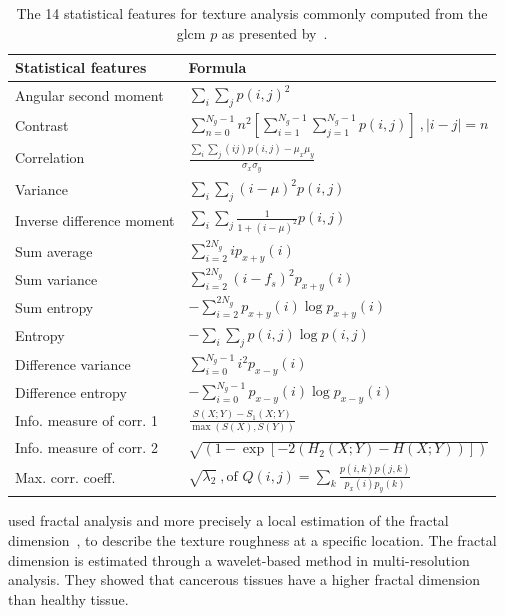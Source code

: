 \begin{enumerate}[leftmargin=*]
\begin{table}
  \caption[The 14 statistical features used in conjunction with \acs*{glcm}
  analysis.]{The 14 statistical features for texture analysis commonly computed
    from the \acs*{glcm} $p$ as presented by~\cite{Haralick1973}.}
  \renewcommand{\arraystretch}{1.5}
  \centering
  \begin{tabular}{ll}
    \toprule
    \textbf{Statistical features} & \textbf{Formula} \\
    \midrule
    Angular second moment & $\sum_i \sum_j p(i,j)^2 $  \\
    Contrast & $\sum_{n=0}^{N_g - 1} n^2 \left[ \sum_{i=1}^{N_g - 1}
               \sum_{j=1}^{N_g - 1} p(i,j) \right] \ , | i-j |=n  $ \\
    Correlation & $\frac{\sum_i \sum_j (ij) p(i,j) - \mu_x \mu_y}{\sigma_x \sigma_y}  $ \\
    Variance & $\sum_i \sum_j (i - \mu)^2 p(i,j)  $ \\
    Inverse difference moment & $\sum_i \sum_j \frac{1}{1+(i - \mu)^2} p(i,j)  $ \\
    Sum average & $\sum_{i=2}^{2N_g} i p_{x+y}(i)  $ \\
    Sum variance & $\sum_{i=2}^{2N_g} (i-f_s)^2 p_{x+y}(i)  $ \\
    Sum entropy & $ - \sum_{i=2}^{2N_g} p_{x+y}(i) \log p_{x+y}(i)  $ \\
    Entropy & $ - \sum_i \sum_j p(i,j) \log p(i,j) $ \\
    Difference variance & $\sum_{i=0}^{N_g-1} i^2 p_{x-y}(i)  $ \\
    Difference entropy & $ - \sum_{i=0}^{N_g-1} p_{x-y}(i) \log p_{x-y}(i)  $ \\
    Info. measure of corr. 1 & $\frac{S(X;Y)-S_1(X;Y)}{\max(S(X),S(Y))}  $ \\
    Info. measure of corr. 2 & $\sqrt{\left( 1 - \exp \left[ -2( H_2(X;Y) - H(X;Y) ) \right] \right)}  $ \\
    Max. corr. coeff. & $ \sqrt{\lambda_2} \ , \text{of } Q(i,j) = \sum_k \frac{p(i,k)p(j,k)}{p_x(i)p_y(k)}  $ \\
    \bottomrule
  \end{tabular}
  \label{tab:glcm}
\end{table}

\citeauthor{Lopes2011} used fractal analysis  and more precisely a local
estimation of the fractal dimension~\cite{Benassi1998}, to describe the texture
roughness at a specific location.
The fractal dimension is estimated through a wavelet-based method in
multi-resolution analysis.
They showed that cancerous tissues have a higher fractal dimension than healthy
tissue.


\end{enumerate}

